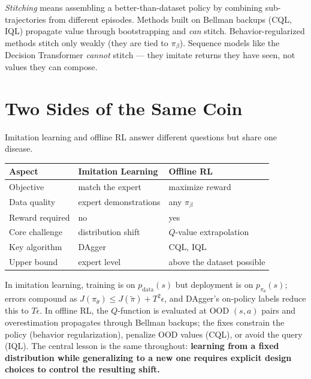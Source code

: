 \documentclass[11pt, oneside]{book}
\begin{document}
\begin{notebox}[title={Stitching: who can and who cannot}]
\emph{Stitching} means assembling a better-than-dataset policy by combining sub-trajectories
from different episodes. Methods built on Bellman backups (CQL, IQL) propagate value
through bootstrapping and \emph{can} stitch. Behavior-regularized methods stitch only
weakly (they are tied to $\pi_\beta$). Sequence models like the Decision Transformer
\emph{cannot} stitch --- they imitate returns they have seen, not values they can compose.
\end{notebox}

\section{Two Sides of the Same Coin}

Imitation learning and offline RL answer different questions but share one disease.

\begin{center}
\begin{tabular}{@{}lll@{}}
\toprule
\textbf{Aspect} & \textbf{Imitation Learning} & \textbf{Offline RL} \\
\midrule
Objective       & match the expert        & maximize reward \\
Data quality    & expert demonstrations   & any $\pi_\beta$ \\
Reward required & no                      & yes \\
Core challenge  & distribution shift      & $Q$-value extrapolation \\
Key algorithm   & DAgger                  & CQL, IQL \\
Upper bound     & expert level            & above the dataset possible \\
\bottomrule
\end{tabular}
\end{center}

In imitation learning, training is on $p_{\text{data}}(s)$ but deployment is on
$p_{\pi_\theta}(s)$; errors compound as $J(\pi_\theta) \le J(\tilde\pi) + T^2\epsilon$,
and DAgger's on-policy labels reduce this to $T\epsilon$. In offline RL, the $Q$-function
is evaluated at OOD $(s,a)$ pairs and overestimation propagates through Bellman backups;
the fixes constrain the policy (behavior regularization), penalize OOD values (CQL), or
avoid the query (IQL). The central lesson is the same throughout: \textbf{learning from a
fixed distribution while generalizing to a new one requires explicit design choices to
control the resulting shift.}
\end{document}
